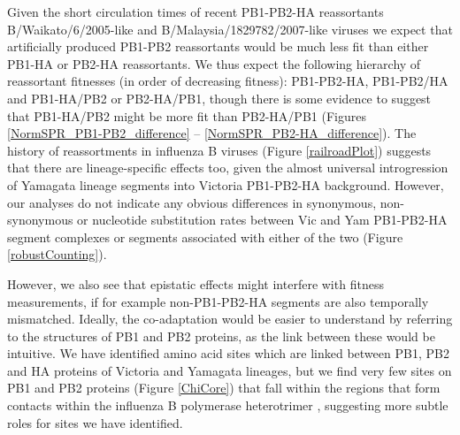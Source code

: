 \documentclass[11pt,oneside,letterpaper]{article}
\begin{document}
Given the short circulation times of recent PB1-PB2-HA reassortants B/Waikato/6/2005-like and B/Malaysia/1829782/2007-like viruses we expect that artificially produced PB1-PB2 reassortants would be much less fit than either PB1-HA or PB2-HA reassortants.
We thus expect the following hierarchy of reassortant fitnesses (in order of decreasing fitness): PB1-PB2-HA, PB1-PB2/HA and PB1-HA/PB2 or PB2-HA/PB1, though there is some evidence to suggest that PB1-HA/PB2 might be more fit than PB2-HA/PB1 (Figures \ref{NormSPR_PB1-PB2_difference} -- \ref{NormSPR_PB2-HA_difference}).
The history of reassortments in influenza B viruses (Figure \ref{railroadPlot}) suggests that there are lineage-specific effects too, given the almost universal introgression of Yamagata lineage segments into Victoria PB1-PB2-HA background.
However, our analyses do not indicate any obvious differences in synonymous, non-synonymous or nucleotide substitution rates between Vic and Yam PB1-PB2-HA segment complexes or segments associated with either of the two (Figure \ref{robustCounting}).

However, we also see that epistatic effects might interfere with fitness measurements, if for example non-PB1-PB2-HA segments are also temporally mismatched.
Ideally, the co-adaptation would be easier to understand by referring to the structures of PB1 and PB2 proteins, as the link between these would be intuitive.
We have identified amino acid sites which are linked between PB1, PB2 and HA proteins of Victoria and Yamagata lineages, but we find very few sites on PB1 and PB2 proteins (Figure \ref{ChiCore}) that fall within the regions that form contacts within the influenza B polymerase heterotrimer \citep{sugiyama2009}, suggesting more subtle roles for sites we have identified.
\end{document}

